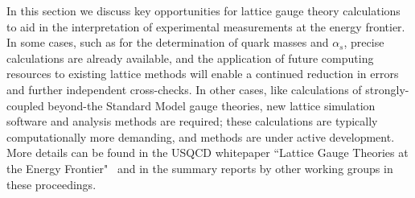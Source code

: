 In this section we discuss key opportunities for lattice gauge theory calculations to aid in the
interpretation of experimental measurements at the energy frontier.  In some cases, such as for the determination of quark masses and $\alpha_s$, precise calculations are already available, and the application of future computing resources to existing lattice methods will enable a continued reduction in errors and further independent cross-checks.  In other cases, like calculations of strongly-coupled beyond-the Standard Model gauge theories, new lattice simulation software and analysis methods are required; these calculations are typically computationally more demanding, and methods are
under active development.  More details can be found in the USQCD whitepaper ``Lattice Gauge Theories at the Energy Frontier"~\cite{USQCD_EF_whitepaper13} and in the summary reports by other working groups in these proceedings. 

